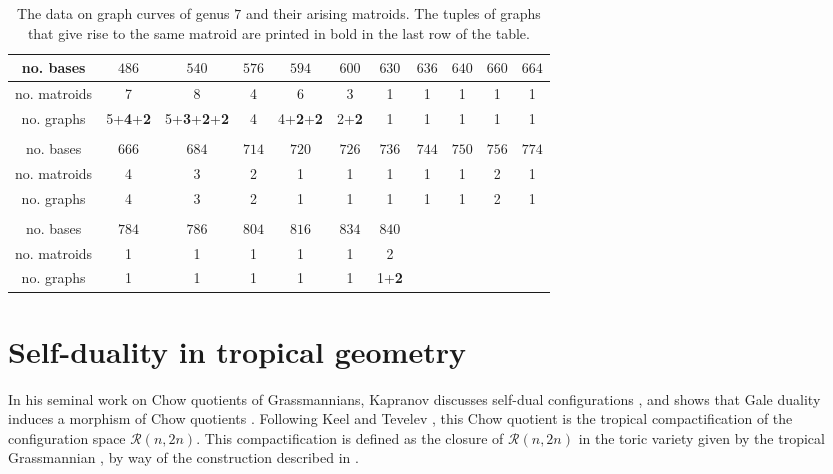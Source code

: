 \documentclass[12pt]{extarticle}
\theoremstyle{definition}
\numberwithin{theorem}{section}
\theoremstyle{plain}\newtheorem{ithm}{Theorem}
\begin{document}
\begin{table}[h]
  \begin{tabular}{c|cccccccccc}
    no. bases & $  486$ & $ 540$ &$576$& $594 $ & $ 600$ &  $630$ & $ 636$ & $ 640$ & $660$ &  $664$  \\\hline 
    no. matroids & 7 & 8& 4 & 6 & 3 &1 & 1 & 1 & 1 & 1\\
    no. graphs & 5+\textbf{4}+\textbf{2} & 5+\textbf{3}+\textbf{2}+\textbf{2}& 4 & 4+\textbf{2}+\textbf{2} & 2+\textbf{2} &1 & 1 & 1 & 1 & 1\\
    \multicolumn{11}{c}{} \\
    no. bases &   $666$ & $684$ & $714$ & $720$ & $726$ &  $736$ & $744$ &  $750$ &  $756$ &  $774$  \\\hline 
    no. matroids & 4 & 3 & 2&  1 & 1 & 1 & 1 & 1 & 2 & 1 \\
    no. graphs &  4 & 3 & 2&  1 & 1 & 1 & 1 & 1 & 2 & 1 \\
    \multicolumn{11}{c}{} \\
    no. bases &  $784$ &$786$ & $804$ &   $816$ &  $834$ & $ 840$ & & & & \\ \hline 
    no. matroids  & 1 & 1 & 1 & 1 & 1 &  2& & & & \\
    no. graphs & 1 & 1 & 1 &  1 & 1 &  1+\textbf{2}& & & & 
  \end{tabular}
  \caption{The data on graph curves of genus $7$ and their arising matroids. The tuples of graphs that give rise to the same matroid are printed in bold in the last row of the table.}\label{tab:genus7}
\end{table}



  \section{Self-duality in tropical geometry}
  \label{sec6}
  
  In his seminal work on Chow quotients of Grassmannians,
  Kapranov discusses self-dual configurations  \cite[Section 2.3]{Kap},
  and shows that Gale duality induces a morphism
  of Chow quotients \cite[Corollary 2.3.14]{Kap}.
  Following Keel and Tevelev \cite[Section 1.14]{KT},
  this Chow quotient is the tropical compactification of
  the configuration space $\mathcal{R}(n,2n)$.
  This compactification is defined as the closure of
  $\mathcal{R}(n,2n)$ in the toric variety given by
  the tropical Grassmannian \cite[Section 4.3]{MS},
  by way of the construction described in \cite[Section~6.4]{MS}.
  
\end{document}
